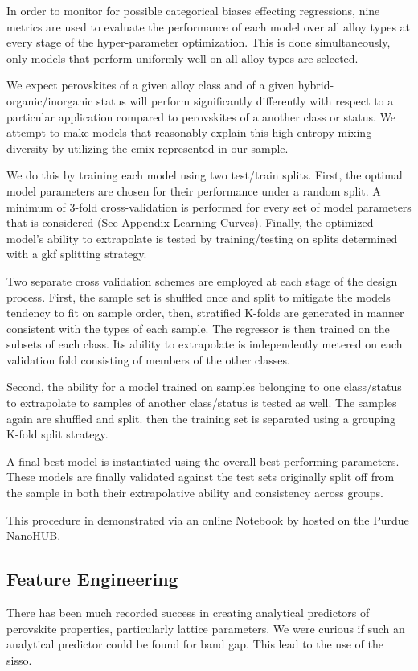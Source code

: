 \documentclass[aip, jmp, amsmath, amssymb]{revtex4-2}
\begin{document}
In order to monitor for possible categorical biases effecting
regressions, nine metrics are used to evaluate the performance of each
model over all alloy types at every stage of the hyper-parameter
optimization. This is done simultaneously, only models that perform
uniformly well on all alloy types are selected.

We expect perovskites of a given alloy class and of a given
hybrid-organic/inorganic status will perform significantly differently
with respect to a particular application compared to perovskites of a
another class or status. We attempt to make models that reasonably
explain this high entropy mixing diversity by utilizing the \gls{cmix} represented in our sample.

We do this by training each model using two test/train splits. First,
the optimal model parameters are chosen for their performance under a
random split. A minimum of 3-fold cross-validation is performed for
every set of model parameters that is considered (See Appendix
\hyperref[sec:org574f136]{Learning Curves}). Finally, the optimized model's ability to
extrapolate is tested by training/testing on splits determined with a
\gls{gkf} splitting strategy.

Two separate cross validation schemes are employed at each stage of
the design process. First, the sample set is shuffled once and split
to mitigate the models tendency to fit on sample order, then,
stratified K-folds are generated in manner consistent with the types
of each sample. The regressor is then trained on the subsets of each
class. Its ability to extrapolate is independently metered on each
validation fold consisting of members of the other classes.

Second, the ability for a model trained on samples belonging to one
class/status to extrapolate to samples of another class/status is
tested as well. The samples again are shuffled and split. then the
training set is separated using a grouping K-fold split strategy.

A final best model is instantiated using the overall best performing
parameters. These models are finally validated against the test sets
originally split off from the sample in both their extrapolative
ability and consistency across groups.

This procedure in demonstrated via an online Notebook by
\citet{manganaris-2022-mrs-comput} hosted on the Purdue NanoHUB.

\subsection*{Feature Engineering}
\label{sec:org3d0fe08}
There has been much recorded success in creating analytical predictors
of perovskite properties, particularly lattice
parameters\cite{jiang-2006-predic-lattic}. We were curious if such an
analytical predictor could be found for band gap. This lead to the use
of the \Acrfull{sisso}\cite{ouyang-2018-sisso}.
\end{document}
